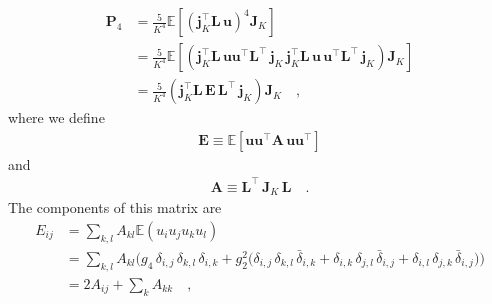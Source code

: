 \documentclass[modern]{aastex62}
\begin{document}
    \begin{align}
        \mathbf{P}_4 & = \frac{5}{K^4}\mathbb{E}\left[ \left(\mathbf{j}_K^\top \mathbf{L} \, \mathbf{u}\right)^4 \mathbf{J}_K \right]
        \nonumber                                                                                                                                                                                                                                                                        \\
                     & = \frac{5}{K^4}\mathbb{E}\left[\left(\mathbf{j}_K^\top \mathbf{L} \,  \mathbf{u} \mathbf{u}^\top  \mathbf{L}^\top \, \mathbf{j}_K \, \mathbf{j}_K^\top \mathbf{L} \,  \mathbf{u} \, \mathbf{u}^\top  \mathbf{L}^\top \, \mathbf{j}_K \right) \mathbf{J}_K \right]
        \nonumber                                                                                                                                                                                                                                                                        \\
                     & = \frac{5}{K^4}\left(\mathbf{j}_K^\top \mathbf{L} \, \mathbf{E} \, \mathbf{L}^\top \, \mathbf{j}_K \right) \mathbf{J}_K
        \quad,
    \end{align}
    where we define
    \begin{align}
        \mathbf{E} \equiv \mathbb{E}\left[ \mathbf{u} \mathbf{u}^\top  \mathbf{A} \,  \mathbf{u} \mathbf{u}^\top \right]
    \end{align}
    and
    \begin{align}
        \mathbf{A} \equiv \mathbf{L}^\top \, \mathbf{J}_K \, \mathbf{L}
        \quad.
    \end{align}
    The components of this matrix are
    \begin{align}
        E_{ij} & =
        \sum\limits_{k,l}A_{kl} \mathbb{E}(u_i u_j u_k u_l)
        \nonumber  \\
               & =
        \sum\limits_{k,l}A_{kl}
        \Big(
        g_4 \, \delta_{i, j} \, \delta_{k, l} \, \delta_{i, k}
        +
        g_2^2 \big(
            \delta_{i, j} \, \delta_{k, l} \, \bar{\delta}_{i, k}
            +
            \delta_{i, k} \, \delta_{j, l} \, \bar{\delta}_{i, j}
            +
            \delta_{i, l} \, \delta_{j, k} \, \bar{\delta}_{i, j}
            \big)
        \Big)
        \nonumber  \\
               & =
        2 A_{ij} + \sum\limits_k A_{kk}
        \quad,
    \end{align}
\end{document}
